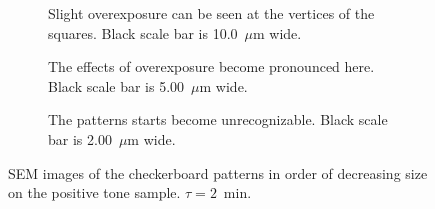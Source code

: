 \begin{figure}[!t]
\begin{subfigure}[t]{0.24\linewidth}
    	\caption{Slight overexposure can be seen at the vertices of the squares. Black scale bar is 10.0~$\mu$m wide.}
    	\label{fig:b2d7_q7}
    \end{subfigure}
    \hfill
    \begin{subfigure}[t]{0.24\linewidth}
    	\centering
    	\caption{The effects of overexposure become pronounced here. Black scale bar is 5.00~$\mu$m wide.}
    	\label{fig:b2d9_q9}
    \end{subfigure}
    \hfill
    \begin{subfigure}[t]{0.24\linewidth}
    	\centering
    	\caption{The patterns starts become unrecognizable. Black scale bar is 2.00~$\mu$m wide.}
    	\label{fig:b2d10_q11}
    \end{subfigure}
    \caption{SEM images of the checkerboard patterns in order of decreasing size on the positive tone sample. $\tau = 2$~min.}
\end{figure}
